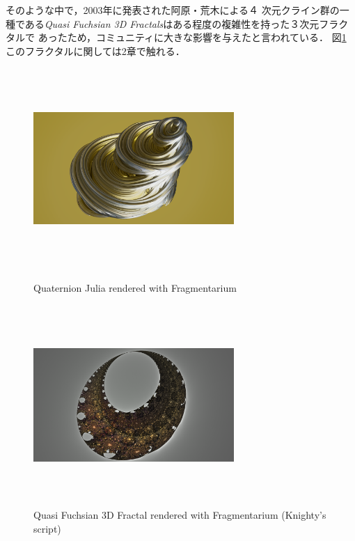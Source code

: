 そのような中で，2003年に発表された阿原・荒木による４
次元クライン群の一種である\textit{Quasi Fuchsian 3D
Fractals}\cite{ahara2003sphairahedral}はある程度の複雑性を持った３次元フラクタルで
あったため，コミュニティに大きな影響を与えたと言われている．
図\ref{fig:quasi-fuchsian-3d}
このフラクタルに関しては2章で触れる．

\begin{figure}[htbp]
  \begin{minipage}[t]{0.49\hsize}
   \center
   \includegraphics[width=3in, height=3in, keepaspectratio]{../img/fractal/qjulia.pdf}
   \caption{Quaternion Julia rendered with Fragmentarium}
   \label{fig:qjulia}
  \end{minipage}
 \begin{minipage}[t]{0.49\hsize}
  \center
  \includegraphics[width=3in, height=3in, keepaspectratio]{../img/fractal/quasi-fuchsian.pdf}
  \caption{Quasi Fuchsian 3D Fractal rendered with Fragmentarium
  (Knighty's script)}
  \label{fig:quasi-fuchsian-3d}
 \end{minipage}
\end{figure}

